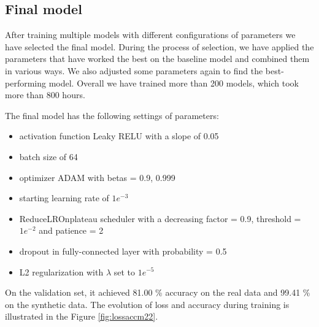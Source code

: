 \subsection{Final model} \label{subsec:finalmodel}

After training multiple models with different configurations of parameters we have selected the final model. During the process of selection, we have applied the parameters that have worked the best on the baseline model and combined them in various ways. We also adjusted some parameters again to find the best-performing model. Overall we have trained more than 200 models, which took more than 800 hours. 

The final model has the following settings of parameters: 

\begin{itemize}
    \setlength\itemsep{1px}
    \item activation function Leaky RELU with a slope of 0.05 
    \item batch size of 64
    \item optimizer ADAM with betas = 0.9, 0.999
    \item starting learning rate of $1e^{-3}$ 
    \item ReduceLROnplateau scheduler with a decreasing factor = 0.9, threshold = $1e^{-2}$ and patience = 2
    \item dropout in fully-connected layer with probability = 0.5
    \item L2 regularization with $\lambda$ set to $1e^{-5}$
\end{itemize}

On the validation set, it achieved 81.00 \% accuracy on the real data and 99.41 \% on the synthetic data. The evolution of loss and accuracy during training is illustrated in the Figure \ref{fig:lossaccm22}. 

